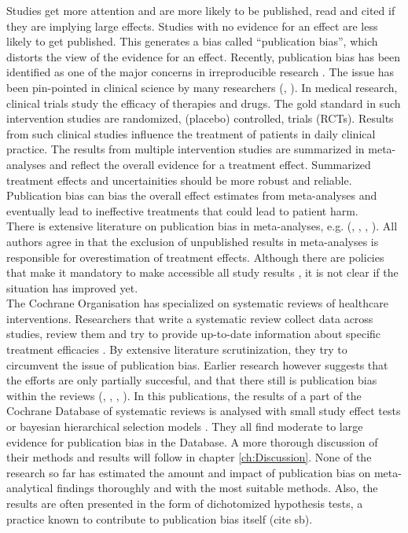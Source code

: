 \documentclass[11pt,a4paper,twoside]{book}\usepackage[]{graphicx}\usepackage[]{color}
\begin{document}
Studies get more attention and are more likely to be published, read and cited if they are implying large effects. Studies with no evidence for an effect are less likely to get published. This generates a bias called ``publication bias'', which distorts the view of the evidence for an effect. Recently, publication bias has been identified as one of the major concerns in irreproducible research \citep{Bishop.2019}. The issue has been pin-pointed in clinical science by many researchers (\citet{pb.clinicalscience1}, \citet{sterne2001}). In medical research, clinical trials study the efficacy of therapies and drugs. The gold standard in such intervention studies are randomized, (placebo) controlled, trials (RCTs). Results from such clinical studies influence the treatment of patients in daily clinical practice. The results from multiple intervention studies are summarized in meta-analyses and reflect the overall evidence for a treatment effect. Summarized treatment effects and uncertainities should be more robust and reliable. Publication bias can bias the overall effect estimates from meta-analyses and eventually lead to ineffective treatments that could lead to patient harm. \\
There is extensive literature on publication bias in meta-analyses, e.g. (\citet{pb.clinicalscience.2013}, %
\citet{grey.literature.4}, \citet{grey.literature.3}, \citet{grey.literature.2}). 
All authors agree in that the exclusion of unpublished results in meta-analyses is responsible for overestimation of treatment effects. Although there are policies that make it mandatory to make accessible all study results \citep{fda}, it is not clear if the situation has improved yet.\\
The Cochrane Organisation has specialized on systematic reviews of healthcare interventions. Researchers that write a systematic review collect data across studies, review them and try to provide up-to-date information about specific treatment efficacies \citep{cochrane.handbook}. By extensive literature scrutinization, they try to circumvent the issue of publication bias. Earlier research however suggests that the efforts are only partially succesful, and that there still is publication bias within the reviews (\citet{Egger}, \citet{Ioannidis2007}, \citet{kicinsky}, \citet{vanAert.2019}). In this publications, the results of a part of the Cochrane Database of systematic reviews is analysed with small study effect tests or bayesian hierarchical selection models \citep{kicinsky}. They all find moderate to large evidence for publication bias in the Database. A more thorough discussion of their methods and results will follow in chapter \ref{ch:Discussion}. None of the research so far has estimated the amount and impact of publication bias on meta-analytical findings thoroughly and with the most suitable methods. Also, the results are often presented in the form of dichotomized hypothesis tests, a practice known to contribute to publication bias itself (cite sb).\\
\end{document}
